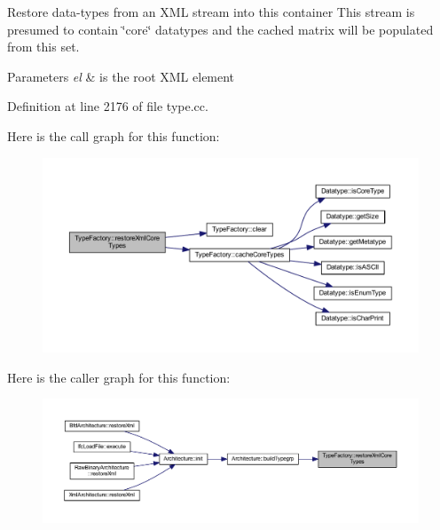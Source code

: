 Restore data-\/types from an X\+ML stream into this container This stream is presumed to contain \char`\"{}core\char`\"{} datatypes and the cached matrix will be populated from this set. 
\begin{DoxyParams}{Parameters}
{\em el} & is the root X\+ML element \\
\hline
\end{DoxyParams}


Definition at line 2176 of file type.\+cc.

Here is the call graph for this function\+:
\nopagebreak
\begin{figure}[H]
\begin{center}
\leavevmode
\includegraphics[width=350pt]{class_type_factory_a24c7308dab804e4f89fd567500b97d63_cgraph}
\end{center}
\end{figure}
Here is the caller graph for this function\+:
\nopagebreak
\begin{figure}[H]
\begin{center}
\leavevmode
\includegraphics[width=350pt]{class_type_factory_a24c7308dab804e4f89fd567500b97d63_icgraph}
\end{center}
\end{figure}
\mbox{\label{class_type_factory_aea5f4036abb11e63ca5f79a9eacfc93c}} 
